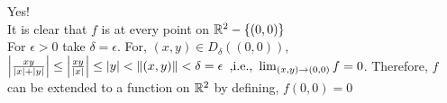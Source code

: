 \begin{soln}{6}
  Yes!\\
  It is clear that $ f $ is \cts at every point on $ \mathbb{R}^2-\{(0,0)\} $\\
  For $ \epsilon >0 $ take $ \delta = \epsilon $. For, $ (x,y) \in D_{\delta}((0,0)) $, $ \left| {\frac{xy}{\left| {x} \right| + \left| {y} \right|}} \right| \leq \left| {\frac{xy}{\left| {x} \right|}} \right| \leq \left| {y} \right| < \norm{(x,y)} < \delta = \epsilon $  $  \text{,i.e., } \lim_{(x,y) \to (0,0)} f = 0$. Therefore, $ f $ can be extended to a \cts function on $\mathbb{R}^2$ by defining, $ f(0,0) = 0 $
\end{soln}